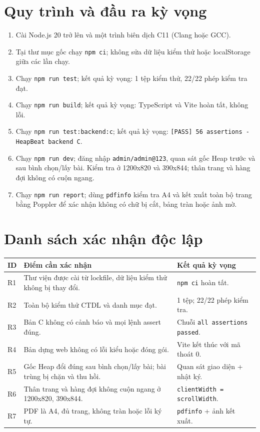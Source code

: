 \documentclass[12pt,a4paper,twoside,openright]{report}
\newcommand{\code}[1]{\texttt{#1}}
\begin{document}
\section{Quy trình và đầu ra kỳ vọng}
\begin{enumerate}
  \item Cài Node.js 20 trở lên và một trình biên dịch C11 (Clang hoặc GCC).
  \item Tại thư mục gốc chạy \code{npm ci}; không sửa dữ liệu kiểm thử hoặc localStorage giữa các lần chạy.
  \item Chạy \code{npm run test}; kết quả kỳ vọng: 1 tệp kiểm thử, 22/22 phép kiểm tra đạt.
  \item Chạy \code{npm run build}; kết quả kỳ vọng: TypeScript và Vite hoàn tất, không lỗi.
  \item Chạy \code{npm run test:backend:c}; kết quả kỳ vọng:
  \code{[PASS] 56 assertions - HeapBeat backend C}.
  \item Chạy \code{npm run dev}; đăng nhập \code{admin/admin@123}, quan sát gốc Heap trước
  và sau bình chọn/lấy bài. Kiểm tra ở 1200x820 và 390x844; thân trang và hàng đợi không có cuộn ngang.
  \item Chạy \code{npm run report}; dùng \code{pdfinfo} kiểm tra A4 và kết xuất toàn bộ trang
  bằng Poppler để xác nhận không có chữ bị cắt, bảng tràn hoặc ảnh mờ.
\end{enumerate}

\section{Danh sách xác nhận độc lập}
\begin{tabularx}{\textwidth}{@{}p{0.9cm}Xp{3.4cm}@{}}
\toprule
\textbf{ID} & \textbf{Điểm cần xác nhận} & \textbf{Kết quả kỳ vọng}\\
\midrule
R1 & Thư viện được cài từ lockfile, dữ liệu kiểm thử không bị thay đổi. & \code{npm ci}
hoàn tất.\\
R2 & Toàn bộ kiểm thử CTDL và danh mục đạt. & 1 tệp; 22/22 phép kiểm tra.\\
R3 & Bản C không có cảnh báo và mọi lệnh assert đúng. & Chuỗi \code{all assertions passed}.\\
R4 & Bản dựng web không có lỗi kiểu hoặc đóng gói. & Vite kết thúc với mã thoát 0.\\
R5 & Gốc Heap đổi đúng sau bình chọn/lấy bài; bài trùng bị chặn và thu hồi. & Quan sát giao
diện + nhật ký.\\
R6 & Thân trang và hàng đợi không cuộn ngang ở 1200x820, 390x844. &
\code{clientWidth = scrollWidth}.\\
R7 & PDF là A4, đủ trang, không tràn hoặc lỗi ký tự. & \code{pdfinfo} + ảnh kết xuất.\\
\bottomrule
\end{tabularx}
\end{document}
